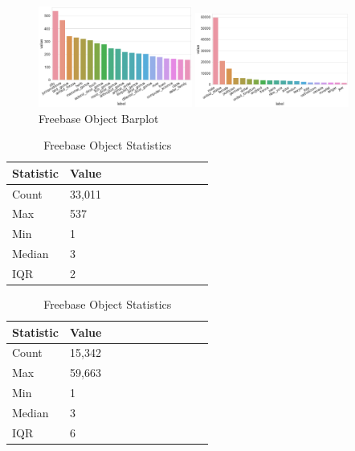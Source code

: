 
\begin{figure}[H]
	\parbox{.5\linewidth}{
   		\caption{Wordnet Object Barplot}
   		\centering
    		\includegraphics[width=0.45\textwidth, height=0.2\textheight]{Wordnet_Object_Counts}
		}
	\hfill
	\parbox{.5\linewidth}{
		\caption{Freebase Object Barplot}
   		\centering
		\includegraphics[width=0.45\textwidth, height=0.2\textheight]{Freebase_Object_Counts}
		}
\end{figure}


\begin{table}[H]
	\parbox{.5\linewidth}{
		\caption{Wordnet Object Statistics}
		\centering
		\begin{tabular}{lllllllllll}
  			\textbf{Statistic} & \textbf{Value}  \\
  			\hline
			Count & 33,011 \\
			Max & 537 \\
			Min & 1 \\
  			Median & 3 \\
  			IQR & 2 \\
		\end{tabular}
		}
	\hfill
	\parbox{.5\linewidth}{
		\caption{Freebase Object Statistics}
		\centering
		\begin{tabular}{lllllllllll}
  			\textbf{Statistic} & \textbf{Value}  \\
  			\hline
			Count & 15,342 \\
			Max & 59,663 \\
			Min & 1 \\
  			Median & 3 \\
  			IQR & 6 \\
		\end{tabular}
		}
\end{table}

